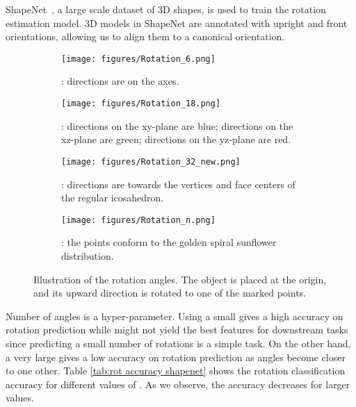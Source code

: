 \documentclass[10pt,twocolumn,letterpaper]{article}
\begin{document}
ShapeNet~\cite{chang2015shapenet}, a large scale dataset of 3D shapes, is used to train the rotation estimation model. 3D models in ShapeNet are annotated with upright and front orientations, allowing us to align them to a canonical orientation. \begin{figure*}
\begin{center}
\begin{subfigure}{.45\textwidth}
  \centering
  \texttt{[image: figures/Rotation\_6.png]}
  \caption{: directions are on the  axes.}
  \label{fig:sfig1}
\end{subfigure}
\hspace{5pt}
\begin{subfigure}{.4\textwidth}
  \centering
  \texttt{[image: figures/Rotation\_18.png]}
  \caption{: directions on the xy-plane are blue; directions on the xz-plane are green; directions on the yz-plane are red.}
  \label{fig:sfig2}
\end{subfigure}
\hspace{5pt}
\begin{subfigure}{.5\textwidth}
  \centering
  \texttt{[image: figures/Rotation\_32\_new.png]}
  \caption{: directions are towards the vertices and face centers of the regular icosahedron.}
  \label{fig:sfig3}
\end{subfigure}
\hspace{5pt}
\begin{subfigure}{.4\textwidth}
  \centering
  \texttt{[image: figures/Rotation\_n.png]}
  \caption{: the points conform to the golden spiral sunflower distribution.}
  \label{fig:sfig4}
\end{subfigure}
\end{center}
   \caption{Illustration of the rotation angles. The object is placed at the origin, and its upward direction is rotated to one of the  marked points.
}
\label{fig:angles}
\end{figure*}


Number of angles  is a hyper-parameter. 
Using a small  gives a high accuracy on rotation prediction while might not yield the best features for downstream tasks since predicting a small number of rotations is a simple task. On the other hand, a very large  gives a low accuracy on rotation prediction as angles become closer to one other. Table \ref{tab:rot accuracy shapenet} shows the rotation classification accuracy for different values of . As we observe, the accuracy decreases for larger  values.
\end{document}
